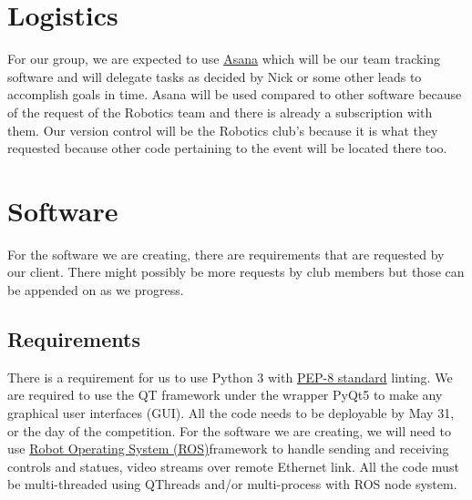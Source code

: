\documentclass[onecolumn, draftclsnofoot, 10pt, compsoc]{IEEEtran}
\begin{document}
\section{Logistics}
For our group, we are expected to use \href{https://app.asana.com}{Asana} which will be our team tracking software and will delegate tasks as decided by Nick or some other leads to accomplish goals in time. Asana will be used compared to other software because of the request of the Robotics team and there is already a subscription with them. Our version control will be the Robotics club's because it is what they requested because other code pertaining to the event will be located there too. 

\section{Software}
For the software we are creating, there are requirements that are requested by our client. There might possibly be more requests by club members but those can be appended on as we progress.
\subsection{Requirements}
There is a requirement for us to use Python 3 with \href{https://www.python.org/dev/peps/pep-0008/}{PEP-8 standard} linting. We are required to use the QT framework under the wrapper PyQt5 to make any graphical user interfaces (GUI). All the code needs to be deployable by May 31, or the day of the competition. For the software we are creating, we will need to use \href{http://www.ros.org/}{Robot Operating System (ROS)}framework to handle sending and receiving controls and statues, video streams over remote Ethernet link. All the code must be multi-threaded using QThreads and/or multi-process with ROS node system.
\end{document}

